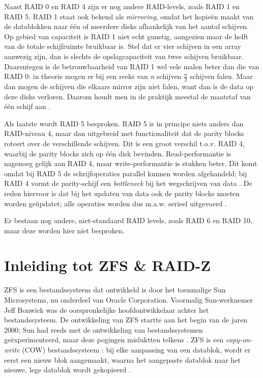 Naast RAID 0 en RAID 4 zijn er nog andere RAID-levels, zoals RAID 1 en RAID 5. RAID 1 staat ook bekend als \textit{mirroring}, omdat het kopieën maakt van de datablokken naar één of meerdere disks afhankelijk van het aantal schijven. Op gebied van capaciteit is RAID 1 niet echt gunstig, aangezien maar de helft van de totale schijfruimte bruikbaar is. Stel dat er vier schijven in een array aanwezig zijn, dan is slechts de opslagcapaciteit van twee schijven bruikbaar. Daarentegen is de betrouwbaarheid van RAID 1 wel vele malen beter dan die van RAID 0: in theorie mogen er bij een reeks van \textit{n} schijven $\frac{n}{2}$ schijven falen. Maar dan mogen de schijven die elkaars mirror zijn niet falen, want dan is de data op deze disks verloren.  Daarom houdt men in de praktijk meestal de maatstaf van één schijf aan \autocite{OSThreePiecesRemzi2015}.

Als laatste wordt RAID 5 besproken. RAID 5 is in principe niets anders dan RAID-niveau 4, maar dan uitgebreid met functionaliteit dat de parity blocks roteert over de verschillende schijven. Dit is een groot verschil t.o.v. RAID 4, waarbij de parity blocks zich op één disk bevinden. Read-performantie is nagenoeg gelijk aan RAID 4, maar write-performantie is stukken beter. Dit komt omdat bij RAID 5 de schrijfoperaties parallel kunnen worden afgehandeld; bij RAID 4 vormt de parity-schijf een \textit{bottleneck} bij het wegschrijven van data \autocite{Chen1994}. De reden hiervoor is dat bij het updaten van data ook de parity blocks moeten worden geüpdatet; alle operaties worden dus m.a.w. serieel uitgevoerd \autocite{OSThreePiecesRemzi2015}.

Er bestaan nog andere, niet-standaard RAID levels, zoals RAID 6 en RAID 10, maar deze worden hier niet besproken.

\section{Inleiding tot ZFS \& RAID-Z}

ZFS is een bestandssysteem dat ontwikkeld is door het toenmalige Sun Microsystems, nu onderdeel van Oracle Corporation. Voormalig Sun-werknemer Jeff Bonwick was de oorspronkelijke hoofdontwikkelaar achter het bestandssysteem. De ontwikkeling van ZFS startte aan het begin van de jaren 2000; Sun had reeds met de ontwikkeling van bestandssystemen geëxperimenteerd, maar deze pogingen misluktten telkens \autocite{Bonwick2015}. ZFS is een \textit{copy-on-write} (COW) bestandssysteem \autocite{BrianHickmann2007}: bij elke aanpassing van een datablok, wordt er eerst een nieuw blok aangemaakt, waarna het aangepaste datablok naar het nieuwe, lege datablok wordt gekopieerd \autocite{ZFSBonwick}.

